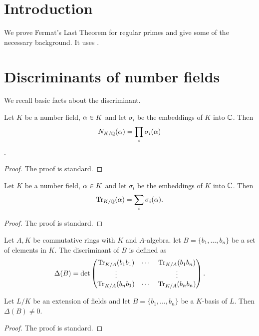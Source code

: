 
\tableofcontents
\section{Introduction}
We prove Fermat's Last Theorem for regular primes and give some of the necessary background. It uses \cite{Samuel,marcus,washington}.

\section{Discriminants of number fields}
We recall basic facts about the discriminant.

\begin{lemma}\label{lemma:alt_definition_of_norm}
	\leanok
	Let $K$ be a number field, $\alpha \in K$ and let $\sigma_i$ be the embeddings of $K$ into $\mathbb{C}$. Then \[N_{K/\mathbb{Q}}(\alpha)=\prod_i \sigma_i(\alpha)  \].
\end{lemma}
\begin{proof}
	\leanok
	The proof is standard.
\end{proof}

\begin{lemma}\label{lemma:alt_definition_of_trace}
	\leanok
	Let $K$ be a number field, $\alpha \in K$ and let $\sigma_i$ be the embeddings of $K$ into $\mathbb{C}$. Then \[\operatorname{Tr}_{K/\mathbb{Q}}(\alpha) =\sum_i \sigma_i(\alpha). \]
\end{lemma}
\begin{proof}
	\leanok
	The proof is standard.
\end{proof}

\begin{definition}\label{defn_of_disc}
	\leanok
	Let $A,K$ be commutative rings with $K$ and $A$-algebra. let $B=\{b_1,\dots,b_n\}$ be a set of elements in $K$. The discriminant of $B$ is defined as \[\Delta(B)=  \det \left (\begin{matrix} \operatorname{Tr}_{K/A}(b_1b_1) &\cdots& \operatorname{Tr}_{K/A}(b_1b_n)\\ \vdots & & \vdots \\  \operatorname{Tr}_{K/A}(b_nb_1) &\cdots& \operatorname{Tr}_{K/A}(b_nb_n)
	\end{matrix} \right ).\]
\end{definition}

\begin{lemma}\label{lem:lin_indep_iff_disc_ne_zero}
	\leanok
	Let $L/K$ be an extension of fields and let $B=\{b_1,\dots,b_n\}$ be a $K$-basis of $L$. Then $\Delta(B) \neq 0$.
\end{lemma}
\begin{proof}
	\leanok
	The proof is standard.
\end{proof}

